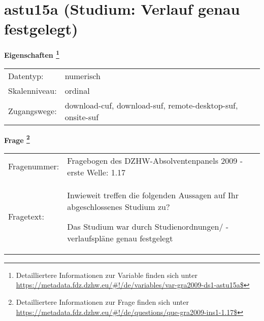 
    \setcounter{footnote}{0}

    \vspace*{-1.8cm}
	\section{astu15a (Studium: Verlauf genau festgelegt)}
	\label{section:astu15a}



    \vspace*{0.5cm}
    \noindent\textbf{Eigenschaften
	\footnote{Detailliertere Informationen zur Variable finden sich unter
		\url{https://metadata.fdz.dzhw.eu/\#!/de/variables/var-gra2009-ds1-astu15a$}}}\\
	\begin{tabularx}{\hsize}{@{}lX}
	Datentyp: & numerisch \\
	Skalenniveau: & ordinal \\
	Zugangswege: &
	  download-cuf, 
	  download-suf, 
	  remote-desktop-suf, 
	  onsite-suf
 \\
    \end{tabularx}



				\vspace*{0.5cm}
                \noindent\textbf{Frage
	                \footnote{Detailliertere Informationen zur Frage finden sich unter
		              \url{https://metadata.fdz.dzhw.eu/\#!/de/questions/que-gra2009-ins1-1.17$}}}\\
				\begin{tabularx}{\hsize}{@{}lX}
					Fragenummer: &
					  Fragebogen des DZHW-Absolventenpanels 2009 - erste Welle:
					  1.17
 \\
					Fragetext: & Inwieweit treffen die folgenden Aussagen auf Ihr abgeschlossenes Studium zu?\par  Das Studium war durch Studienordnungen/ -verlaufspläne genau festgelegt \\
				\end{tabularx}





